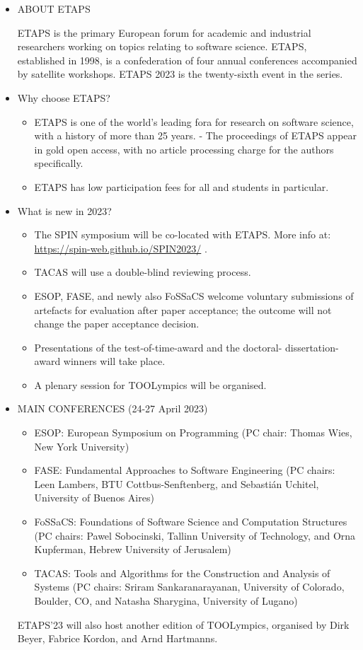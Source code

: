 \documentclass[prodmode,acmtecs]{acmsmall} %
\begin{document}
\begin{itemize}\item  ABOUT ETAPS  
 
  ETAPS is the primary European forum for academic and industrial researchers working on topics relating to software science. ETAPS, established in 1998, is a confederation of four annual conferences accompanied by satellite workshops. ETAPS 2023 is the twenty-sixth event in the series.  
 
\item  Why choose ETAPS? 
 
\begin{itemize}\item  ETAPS is one of the world's leading fora for research on software science, with a history of more than 25 years. - The proceedings of ETAPS appear in gold open access, with no article processing charge for the authors specifically. 
\item  ETAPS has low participation fees for all and students in particular. 
\end{itemize} 
\item  What is new in 2023? 
 
\begin{itemize}\item The SPIN symposium will be co-located with ETAPS. More info at: \href{https://spin-web.github.io/SPIN2023/}{https://spin-web.github.io/SPIN2023/} . 
\item TACAS will use a double-blind reviewing process.
\item ESOP, FASE, and newly also FoSSaCS welcome voluntary submissions of artefacts for evaluation after paper acceptance; the outcome will not change the paper acceptance decision. 
\item Presentations of the test-of-time-award and the doctoral- dissertation-award winners will take place. 
\item A plenary session for TOOLympics will be organised. 
\end{itemize} 
\item  MAIN CONFERENCES (24-27 April 2023)  
 
\begin{itemize}\item  ESOP: European Symposium on Programming (PC chair: Thomas Wies, New York University) 
\item  FASE: Fundamental Approaches to Software Engineering (PC chairs: Leen Lambers, BTU Cottbus-Senftenberg, and Sebastián Uchitel, University of Buenos Aires) 
\item  FoSSaCS: Foundations of Software Science and Computation Structures (PC chairs: Pawel Sobocinski, Tallinn University of Technology, and Orna Kupferman, Hebrew University of Jerusalem) 
\item  TACAS: Tools and Algorithms for the Construction and Analysis of Systems (PC chairs: Sriram Sankaranarayanan, University of Colorado, Boulder, CO, and Natasha Sharygina, University of Lugano) 
\end{itemize} 
  ETAPS'23 will also host another edition of TOOLympics, organised by Dirk Beyer, Fabrice Kordon, and Arnd Hartmanns.  
 

\end{itemize}
\end{document}
